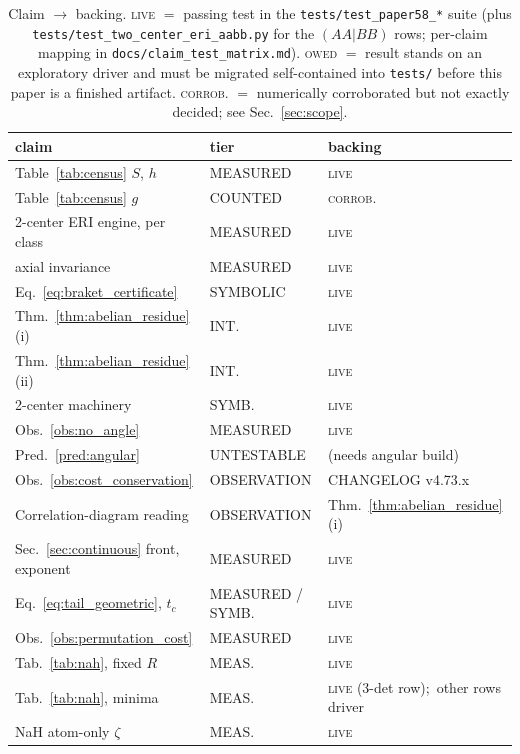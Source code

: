 \documentclass[aps,pra,twocolumn,superscriptaddress,longbibliography]{revtex4-2}
\begin{document}
\begin{table}[b]
\caption{Claim $\to$ backing.  \textsc{live} $=$ passing test in the
\texttt{tests/test\_paper58\_*} suite (plus
\texttt{tests/test\_two\_center\_eri\_aabb.py} for the $(AA|BB)$ rows; per-claim mapping in
\texttt{docs/claim\_test\_matrix.md}).  \textsc{owed} $=$
result stands on an exploratory driver and must be migrated
self-contained into \texttt{tests/} before this paper is a finished
artifact.  \textsc{corrob.} $=$ numerically corroborated but not exactly
decided; see Sec.~\ref{sec:scope}.}
\label{tab:backing}
\begin{ruledtabular}
\begin{tabular}{lll}
claim & tier & backing \\
\hline
Table~\ref{tab:census} $S$, $h$ & MEASURED & \textsc{live} \\
Table~\ref{tab:census} $g$ & COUNTED & \textsc{corrob.} \\
2-center ERI engine, per class & MEASURED & \textsc{live} \\
axial invariance & MEASURED & \textsc{live} \\
Eq.~\eqref{eq:braket_certificate} & SYMBOLIC & \textsc{live} \\
Thm.~\ref{thm:abelian_residue}(i) & INT. & \textsc{live} \\
Thm.~\ref{thm:abelian_residue}(ii) & INT. & \textsc{live} \\
2-center machinery & SYMB. & \textsc{live} \\
Obs.~\ref{obs:no_angle} & MEASURED & \textsc{live} \\
Pred.~\ref{pred:angular} & UNTESTABLE & (needs angular build) \\
Obs.~\ref{obs:cost_conservation} & OBSERVATION & CHANGELOG v4.73.x \\
Correlation-diagram reading & OBSERVATION & Thm.~\ref{thm:abelian_residue}(i) \\
Sec.~\ref{sec:continuous} front, exponent & MEASURED & \textsc{live} \\
Eq.~\eqref{eq:tail_geometric}, $t_c$ & MEASURED / SYMB. & \textsc{live} \\
Obs.~\ref{obs:permutation_cost} & MEASURED & \textsc{live} \\
Tab.~\ref{tab:nah}, fixed $R$ & MEAS. & \textsc{live} \\
Tab.~\ref{tab:nah}, minima & MEAS. & \textsc{live} (3-det row);\ other rows driver \\
NaH atom-only $\zeta$ & MEAS. & \textsc{live} \\

\end{tabular}
\end{ruledtabular}
\end{table}
\end{document}
